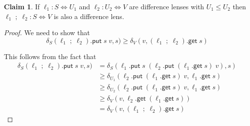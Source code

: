 \documentclass[acmsmall,review,anonymous]{acmart}\settopmatter{printfolios=true,printccs=false,printacmref=false}
\theoremstyle{definition}
\newtheorem{claim}{Claim}
\newcommand{\kw}[1]{\ensuremath{\mathsf{#1}}\xspace}
\newcommand{\get}{\ensuremath{\kw{get}}\xspace}
\newcommand{\pput}{\ensuremath{\kw{put}}\xspace}
\begin{document}
\begin{claim}
If $\ell_1 : S  \Leftrightarrow U_1$ and $\ell_2 : U_2 \Leftrightarrow V$ are difference lenses with $U_1 \leq U_2$ then
$\ell_1 \; ; \; \ell_2 :  S \Leftrightarrow V$ is also a difference lens.
\end{claim}
\begin{proof}
We need to show that
$$
\delta_S(\ell_1 \; ; \; \ell_2).\pput \; s \; v, s) \geq \delta_V(v, (\ell_1 \; ; \; \ell_2).\get \; s)$$

This follows from the fact that
\begin{align*}
\delta_S(\ell_1 \; ; \; \ell_2).\pput \; s \; v, s) &=
\delta_S(\ell_1.\pput \; s \; (\ell_2.\pput \;
(\ell_1.\get \; s) \; v), s)\\
&\geq \delta_{U_1}(\ell_2.\pput \;
(\ell_1.\get \; s) \; v, \ell_1.\get \; s)\\
&\geq \delta_{U_2}(\ell_2.\pput \;
(\ell_1.\get \; s) \; v, \ell_1.\get \; s)\\
&\geq \delta_V(v, \ell_2.\get \; (\ell_1.\get \; s))\\
&= \delta_V(v, (\ell_1 \; ; \; \ell_2).\get \; s)
\end{align*}
\end{proof}
\end{document}
